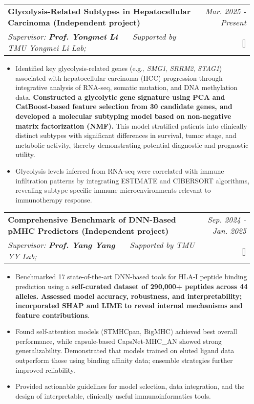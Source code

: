 \documentclass[a4paper,11pt]{article}
\makeatletter
\newcommand{\resumeProject}[4]{
\vspace{0.5mm}\item
    \begin{tabular*}{0.98\textwidth}[t]{l@{\extracolsep{\fill}}r}
        \textbf{#1} & \textit{\footnotesize{#3}} \\
        \footnotesize{\textit{#2}} & \footnotesize{#4}
    \end{tabular*}
    \vspace{-2.4mm}
}
\newcommand{\resumeItemListStart}{\begin{itemize}[leftmargin=*,labelsep=1mm,itemsep=0.5mm]}
\newcommand{\resumeItemListEnd}{\end{itemize}\vspace{-2mm}}
\makeatother
\begin{document}
\begin{justify}
\resumeProject
  {Glycolysis-Related Subtypes in Hepatocellular Carcinoma \small{(Independent project)}}
  {Supervisor: \textbf{Prof. Yongmei Li} \ \ \ Supported by TMU Yongmei Li Lab;}
  {Mar. 2025 - Present}
  {{}[\href{https://github.com/wunaiwuhuang/materials/tree/main/Award\_and\_honour\%E8\%8E\%B7\%E5\%A5\%96\%E8\%AF\%81\%E6\%98\%8E/innovation\%20and\%20Entrepreneurship\%20Competition}{\textcolor{darkblue}{\faGithub}}]}
\resumeItemListStart
  \item Identified key glycolysis-related genes (e.g., \textit{SMG1}, \textit{SRRM2}, \textit{STAG1}) associated with hepatocellular carcinoma (HCC) progression through integrative analysis of RNA-seq, somatic mutation, and DNA methylation data. \textbf{Constructed a glycolytic gene signature using PCA and CatBoost-based feature selection from 30 candidate genes, and developed a molecular subtyping model based on non-negative matrix factorization (NMF).} This model stratified patients into clinically distinct subtypes with significant differences in survival, tumor stage, and metabolic activity, thereby demonstrating potential diagnostic and prognostic utility. 
  \item Glycolysis levels inferred from RNA-seq were correlated with immune infiltration patterns by integrating ESTIMATE and CIBERSORT algorithms, revealing subtype-specific immune microenvironments relevant to immunotherapy response.
\resumeItemListEnd

\resumeProject
  {Comprehensive Benchmark of DNN-Based pMHC Predictors \small{(Independent project)}}
  {Supervisor: \textbf{Prof. Yang Yang} \ \ \ Supported by TMU YY Lab;}
  {Sep. 2024 - Jan. 2025}
  {{}[\href{https://github.com/wunaiwuhuang/materials/tree/main/Award\_and\_honour\%E8\%8E\%B7\%E5\%A5\%96\%E8\%AF\%81\%E6\%98\%8E/innovation\%20and\%20Entrepreneurship\%20Competition}{\textcolor{darkblue}{\faGithub}}]}
\resumeItemListStart
  \item Benchmarked 17 state-of-the-art DNN-based tools for HLA-I peptide binding prediction using a \textbf{self-curated dataset of 290,000+ peptides across 44 alleles. Assessed model accuracy, robustness, and interpretability; incorporated SHAP and LIME to reveal internal mechanisms and feature contributions}.
  \item Found self-attention models (STMHCpan, BigMHC) achieved best overall performance, while capsule-based CapsNet-MHC\_AN showed strong generalizability. Demonstrated that models trained on eluted ligand data outperform those using binding affinity data; ensemble strategies further improved reliability.
  \item Provided actionable guidelines for model selection, data integration, and the design of interpretable, clinically useful immunoinformatics tools.
\resumeItemListEnd


\end{justify}
\end{document}
